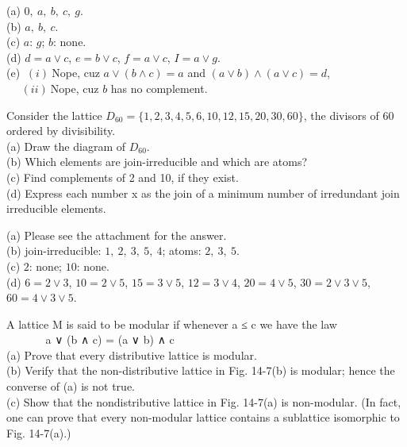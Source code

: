 \documentclass[11pt, a4paper, UTF8]{ctexart}
\begin{document}
\begin{solution}
  (a) $0,~a,~b,~c,~g$.\\
  (b) $a,~b,~c$.\\
  (c) $a$: $g$;  $b$: none.\\
  (d) $d = a \vee c$, $e = b \vee c$, $f = a \vee c$, $I = a \vee g$.\\
  (e) $~(i)~$Nope, cuz $a \vee (b \wedge c) = a$ and $(a \vee b) \wedge (a \vee c) = d$,\\
  $~~~~~~(ii)~$Nope, cuz $b$ has no complement.
\end{solution}

\begin{problem}[SM: 14.70]
  Consider the lattice $D_{60} = \{1, 2, 3, 4, 5, 6, 10, 12, 15, 20, 30, 60\}$, the divisors of 60 ordered by divisibility.\\
(a) Draw the diagram of $D_{60}$.\\
(b) Which elements are join-irreducible and which are atoms?\\
(c) Find complements of 2 and 10, if they exist.\\
(d) Express each number x as the join of a minimum number of irredundant join irreducible elements.
\end{problem}

\begin{solution}
  (a) Please see the attachment for the answer.\\
  (b) join-irreducible: $1,~2,~3,~5,~4$;  atoms: $2,~3,~5$.\\
  (c) $2$: none;  $10$: none.\\
  (d) $6 = 2 \vee 3$, $10 = 2 \vee 5$, $15 = 3 \vee 5$, $12 = 3 \vee 4$, 
  $20 = 4 \vee 5$, $30 = 2 \vee 3 \vee 5$, $60 = 4 \vee 3 \vee 5$.
\end{solution}

\begin{problem}[SM: 14.75]
  A lattice M is said to be modular if whenever a ≤ c we have the law\\
$~~~~~~~~~~~~~~~~$a ∨ (b ∧ c) = (a ∨ b) ∧ c\\
(a) Prove that every distributive lattice is modular.\\
(b) Verify that the non-distributive lattice in Fig. 14-7(b) is modular; hence the converse of (a) is not true.\\
(c) Show that the nondistributive lattice in Fig. 14-7(a) is non-modular. (In fact, one can prove that every non-modular
lattice contains a sublattice isomorphic to Fig. 14-7(a).)
\end{problem}
\end{document}
